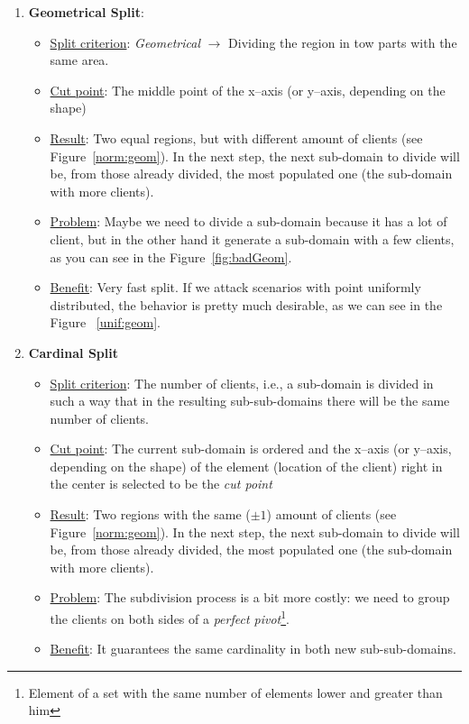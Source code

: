 \begin{enumerate}
\item {\bf Geometrical Split}: 
\begin{itemize}
\item \underline{Split criterion}: {\it Geometrical} $\rightarrow$ Dividing the region in tow parts with the same area.
\item \underline{Cut point}: The middle point of the x--axis (or y--axis, depending on the shape)
\item \underline{Result}: Two equal regions, but with different amount of clients (see Figure~\ref{norm:geom}). In the next step, the next sub-domain to divide will be, from those already divided, the most populated one (the sub-domain with more clients).
\item \underline{Problem}: Maybe we need to divide a sub-domain because it has a lot of client, but in the other hand it generate a sub-domain with a few clients, as you can see in the Figure~\ref{fig:badGeom}.
\item \underline{Benefit}: Very fast split. If we attack scenarios with point uniformly distributed, the behavior is pretty much desirable, as we can see in the Figure ~\ref{unif:geom}. 
\end{itemize}

\item {\bf Cardinal Split}
\begin{itemize}
\item \underline{Split criterion}: The number of clients, i.e., a sub-domain is divided in such a way that in the resulting sub-sub-domains there will be the same number of clients.
\item \underline{Cut point}: The current sub-domain is ordered and the x--axis (or y--axis, depending on the shape) of the element (location of the client) right in the center is selected to be the {\it cut point}
\item \underline{Result}: Two regions with the same ($\pm 1$) amount of clients (see Figure~\ref{norm:geom}). In the next step, the next sub-domain to divide will be, from those already divided, the most populated one (the sub-domain with more clients).
\item \underline{Problem}: The subdivision process is a bit more costly: we need to group the clients on both sides of a {\it perfect pivot}\footnote{Element of a set with the same number of elements lower and greater than him}.
\item \underline{Benefit}: It guarantees the same cardinality in both new sub-sub-domains.
\end{itemize}


\end{enumerate}
